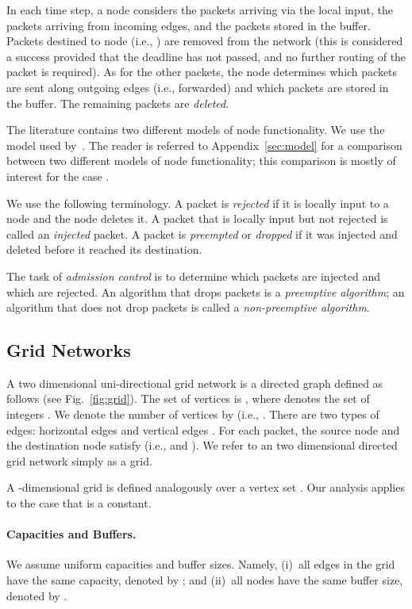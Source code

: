 \documentclass[11pt]{article}
\newenvironment{proof sketch}[1]{\noindent {\emph{Proof sketch of #1:}}}{\hfill \qed}
\begin{document}
In each time step, a node  considers the packets arriving via the local input, the packets arriving from incoming edges, and the packets stored in the buffer.  Packets destined to node  (i.e., ) are removed from the network (this is considered a success provided that the deadline has not passed, and no further routing of the packet is required). As for the other packets, the node determines which packets are sent along outgoing edges (i.e., forwarded) and which packets are stored in the buffer. The remaining packets are \emph{deleted}.

The literature contains two different models of node functionality. We use the model used by~\cite{ARSU,RR}. The reader is referred to Appendix~\ref{sec:model} for a comparison between two different models of node functionality; this comparison is mostly of interest for the case .

We use the following terminology.  A packet is \emph{rejected} if it is locally input to a node and the node deletes it. A packet that is locally input but not rejected is called an \emph{injected} packet. A packet is \emph{preempted} or \emph{dropped} if it was injected and deleted before it reached its destination.


The task of \emph{admission control} is to determine which packets are injected and which are rejected.  An algorithm that drops packets is a \emph{preemptive algorithm}; an algorithm that does not drop packets is called a \emph{non-preemptive algorithm}.

\subsection{Grid Networks}
A two dimensional  uni-directional
grid network is a directed graph  defined as
follows (see Fig.~\ref{fig:grid}). The set of vertices is
, where 
denotes the set of integers .  We denote
the number of vertices by  (i.e., .  There are two types of edges: horizontal edges
 and vertical edges
. For each packet, the source
node  and the destination node
 satisfy  (i.e.,
 and ).  We refer to
an  two dimensional directed grid
network simply as a grid.

A -dimensional grid is defined analogously over a vertex set
. Our analysis applies to the case
that  is a constant.

\paragraph{Capacities and Buffers.}
We assume uniform capacities and buffer sizes. Namely, (i)~all edges in the grid have
the same capacity, denoted by ; and (ii)~all nodes have the same buffer size,
denoted by .
\end{document}
